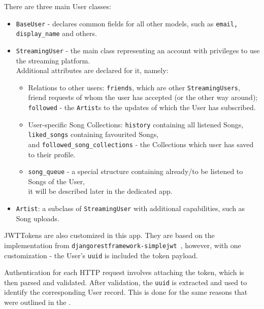 There are three main User classes:
\begin{itemize}
    \item \texttt{BaseUser} - declares common fields for all other models, such as \texttt{email, display\_name} and others.
    \item \texttt{StreamingUser} - the main class representing an account with privileges to use the streaming platform.\\
    Additional attributes are declared for it, namely:
    \begin{itemize}
        \item Relations to other users: \texttt{friends}, which are other \texttt{StreamingUsers},\\
        friend requests of whom the user has accepted (or the other way around);\\
        \texttt{followed} - the \texttt{Artist}s to the updates of which the User has subscribed.

        \item User-specific Song Collections: \texttt{history} containing all listened Songs,\\
        \texttt{liked\_songs} containing favourited Songs,\\
        and \texttt{followed\_song\_collections} - the Collections which user has saved to their profile.

        \item \texttt{song\_queue} - a special structure containing already/to be listened to Songs of the User,\\
        it will be described later in the dedicated app.
    \end{itemize}
    \item \texttt{Artist}: a subclass of \texttt{StreamingUser} with additional capabilities, such as Song uploads.
\end{itemize}

JWTTokens are also customized in this app.
They are based on the implementation from \texttt{djangorestframework-simplejwt}~\cite{simplejwt},
however, with one customization - the User’s \texttt{uuid} is included the token payload.

Authentication for each HTTP request involves attaching the token, which is then parsed and validated.
After validation, the \texttt{uuid} is extracted and used to identify the corresponding User record.
This is done for the same reasons that were outlined in the .

